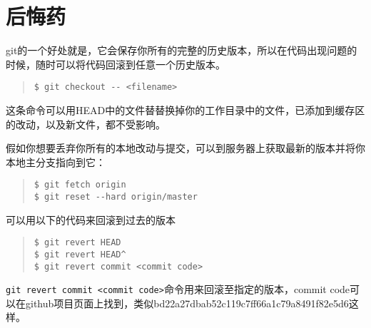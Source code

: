 \documentclass{article}
\begin{document}
	\section{后悔药} %
	\label{sec:后悔药}
		git的一个好处就是，它会保存你所有的完整的历史版本，所以在代码出现问题的时候，随时可以将代码回滚到任意一个历史版本。
		\begin{quote}
			\begin{lstlisting}
$ git checkout -- <filename>
			\end{lstlisting}
		\end{quote}
		这条命令可以用HEAD中的文件替替换掉你的工作目录中的文件，已添加到缓存区的改动，以及新文件，都不受影响。
		\par 假如你想要丢弃你所有的本地改动与提交，可以到服务器上获取最新的版本并将你本地主分支指向到它：
		\begin{quote}
			\begin{lstlisting}
$ git fetch origin
$ git reset --hard origin/master
			\end{lstlisting}
		\end{quote}
		可以用以下的代码来回滚到过去的版本
		\begin{quote}
			\begin{lstlisting}
$ git revert HEAD
$ git revert HEAD^
$ git revert commit <commit code>
			\end{lstlisting}
		\end{quote}
		{\tt git revert commit <commit code>}命令用来回滚至指定的版本，commit code可以在github项目页面上找到，类似bd22a27dbab52c119c7ff66a1c79a8491f82e5d6这样。
\end{document}
